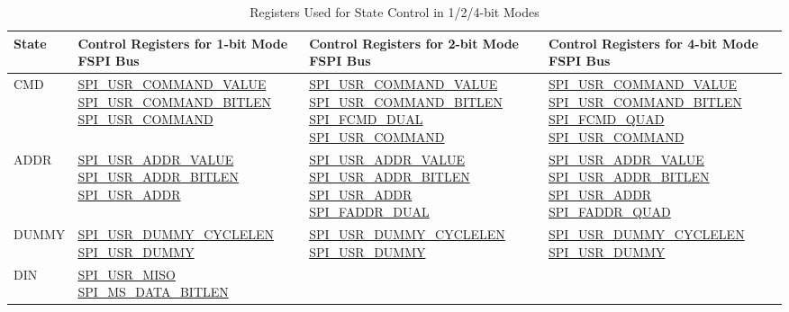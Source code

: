 \documentclass[main\_\_EN.tex]{subfiles}
\begin{document}
\begin{landscape}
\begin{longtable}[c]{ |L{1.3cm}|L{5.2cm}|L{5.2cm}|L{5.2cm}| }
\caption{Registers Used for State Control in 1/2/4-bit Modes}
\\\hline
{}      
\textbf{State} & \textbf{ Control Registers for 1-bit Mode FSPI Bus} & \textbf{ Control Registers for 2-bit Mode FSPI Bus} & \textbf{ Control Registers for 4-bit Mode FSPI Bus}\\
     \hline
\endhead
\label{tab:spi-usr1}
CMD  &\hyperref[fielddesc:SPIUSRCOMMANDVALUE]{SPI\_USR\_COMMAND\_VALUE} 
     \hyperref[fielddesc:SPIUSRCOMMANDBITLEN]{SPI\_USR\_COMMAND\_BITLEN} \hyperref[fielddesc:SPIUSRCOMMAND]{SPI\_USR\_COMMAND}
     &\hyperref[fielddesc:SPIUSRCOMMANDVALUE]{SPI\_USR\_COMMAND\_VALUE} \hyperref[fielddesc:SPIUSRCOMMANDBITLEN]{SPI\_USR\_COMMAND\_BITLEN} \hyperref[fielddesc:SPIFCMDDUAL]{SPI\_FCMD\_DUAL}    \hyperref[fielddesc:SPIUSRCOMMAND]{SPI\_USR\_COMMAND} & \hyperref[fielddesc:SPIUSRCOMMANDVALUE]{SPI\_USR\_COMMAND\_VALUE} \hyperref[fielddesc:SPIUSRCOMMANDBITLEN]{SPI\_USR\_COMMAND\_BITLEN}  \hyperref[fielddesc:SPIFCMDQUAD]{SPI\_FCMD\_QUAD}   \hyperref[fielddesc:SPIUSRCOMMAND]{SPI\_USR\_COMMAND} \\
     \hline
ADDR &\hyperref[fielddesc:SPIUSRADDRVALUE]{SPI\_USR\_ADDR\_VALUE}           
     \hyperref[fielddesc:SPIUSRADDRBITLEN]{SPI\_USR\_ADDR\_BITLEN}   \hyperref[fielddesc:SPIUSRADDR]{SPI\_USR\_ADDR}
     &\hyperref[fielddesc:SPIUSRADDRVALUE]{SPI\_USR\_ADDR\_VALUE}  \hyperref[fielddesc:SPIUSRADDRBITLEN]{SPI\_USR\_ADDR\_BITLEN}   \hyperref[fielddesc:SPIUSRADDR]{SPI\_USR\_ADDR}     \hyperref[fielddesc:SPIFADDRDUAL]{SPI\_FADDR\_DUAL} & 
    \hyperref[fielddesc:SPIUSRADDRVALUE]{SPI\_USR\_ADDR\_VALUE}  \hyperref[fielddesc:SPIUSRADDRBITLEN]{SPI\_USR\_ADDR\_BITLEN}   \hyperref[fielddesc:SPIUSRADDR]{SPI\_USR\_ADDR}               \hyperref[fielddesc:SPIFADDRQUAD]{SPI\_FADDR\_QUAD} \\
     \hline
DUMMY&\hyperref[fielddesc:SPIUSRDUMMYCYCLELEN]{SPI\_USR\_DUMMY\_CYCLELEN}   
     \hyperref[fielddesc:SPIUSRDUMMY]{SPI\_USR\_DUMMY} 
     &\hyperref[fielddesc:SPIUSRDUMMYCYCLELEN]{SPI\_USR\_DUMMY\_CYCLELEN}    \hyperref[fielddesc:SPIUSRDUMMY]{SPI\_USR\_DUMMY} & 
    \hyperref[fielddesc:SPIUSRDUMMYCYCLELEN]{SPI\_USR\_DUMMY\_CYCLELEN}    \hyperref[fielddesc:SPIUSRDUMMY]{SPI\_USR\_DUMMY}\\
     \hline
DIN  &\hyperref[fielddesc:SPIUSRMISO]{SPI\_USR\_MISO}   
      \hyperref[fielddesc:SPIMSDATABITLEN]{SPI\_MS\_DATA\_BITLEN} 

\end{longtable}
\end{landscape}
\end{document}
